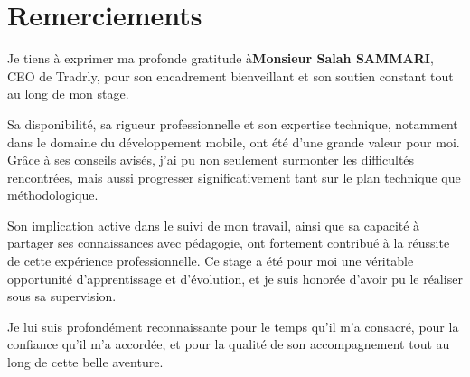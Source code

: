 \chapter*{Remerciements}

\vspace{1cm} %

\noindent Je tiens à exprimer ma profonde gratitude à\textbf{Monsieur Salah SAMMARI}, CEO de Tradrly, pour son encadrement bienveillant et son soutien constant tout au long de mon stage.
\newline

\noindent Sa disponibilité, sa rigueur professionnelle et son expertise technique, notamment dans le domaine du développement mobile, ont été d'une grande valeur pour moi. Grâce à ses conseils avisés, j’ai pu non seulement surmonter les difficultés rencontrées, mais aussi progresser significativement tant sur le plan technique que méthodologique. 
\newline

\noindent Son implication active dans le suivi de mon travail, ainsi que sa capacité à partager ses connaissances avec pédagogie, ont fortement contribué à la réussite de cette expérience professionnelle. Ce stage a été pour moi une véritable opportunité d’apprentissage et d’évolution, et je suis honorée d’avoir pu le réaliser sous sa supervision.
\newline

\noindent Je lui suis profondément reconnaissante pour le temps qu’il m’a consacré, pour la confiance qu’il m’a accordée, et pour la qualité de son accompagnement tout au long de cette belle aventure.